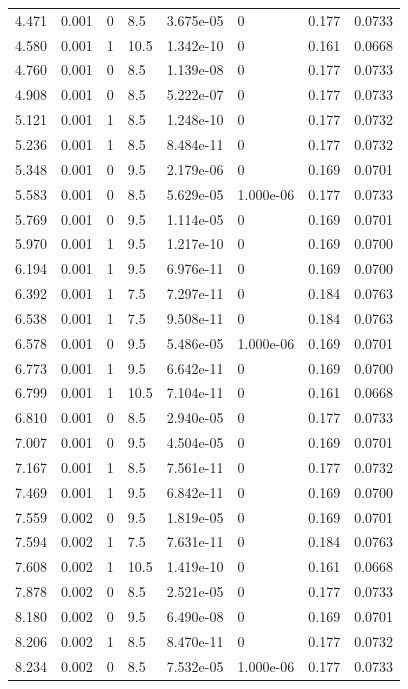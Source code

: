 \documentclass[preview]{standalone}
\begin{document}
{{\begin{tabular}{L{1.2cm}C{1.2cm} C{0.3cm}C{0.5cm} C{1.4cm}C{1.4cm} C{1.4cm}C{1.4cm}}
  4.471  &  0.001  & 0     & 8.5 &  3.675e-05  & 0  & 0.177 &  0.0733   \\ 
  4.580  &  0.001  & 1     & 10.5 &  1.342e-10  & 0  & 0.161 &  0.0668   \\ 
  4.760  &  0.001  & 0     & 8.5 &  1.139e-08  & 0  & 0.177 &  0.0733   \\ 
  4.908  &  0.001  & 0     & 8.5 &  5.222e-07  & 0  & 0.177 &  0.0733   \\ 
  5.121  &  0.001  & 1     & 8.5 &  1.248e-10  & 0  & 0.177 &  0.0732   \\ 
  5.236  &  0.001  & 1     & 8.5 &  8.484e-11  & 0  & 0.177 &  0.0732   \\ 
  5.348  &  0.001  & 0     & 9.5 &  2.179e-06  & 0  & 0.169 &  0.0701   \\ 
  5.583  &  0.001  & 0     & 8.5 &  5.629e-05  & 1.000e-06  & 0.177 &  0.0733   \\ 
  5.769  &  0.001  & 0     & 9.5 &  1.114e-05  & 0  & 0.169 &  0.0701   \\ 
  5.970  &  0.001  & 1     & 9.5 &  1.217e-10  & 0  & 0.169 &  0.0700   \\ 
  6.194  &  0.001  & 1     & 9.5 &  6.976e-11  & 0  & 0.169 &  0.0700   \\ 
  6.392  &  0.001  & 1     & 7.5 &  7.297e-11  & 0  & 0.184 &  0.0763   \\ 
  6.538  &  0.001  & 1     & 7.5 &  9.508e-11  & 0  & 0.184 &  0.0763   \\ 
  6.578  &  0.001  & 0     & 9.5 &  5.486e-05  & 1.000e-06  & 0.169 &  0.0701   \\ 
  6.773  &  0.001  & 1     & 9.5 &  6.642e-11  & 0  & 0.169 &  0.0700   \\ 
  6.799  &  0.001  & 1     & 10.5 &  7.104e-11  & 0  & 0.161 &  0.0668   \\ 
  6.810  &  0.001  & 0     & 8.5 &  2.940e-05  & 0  & 0.177 &  0.0733   \\ 
  7.007  &  0.001  & 0     & 9.5 &  4.504e-05  & 0  & 0.169 &  0.0701   \\ 
  7.167  &  0.001  & 1     & 8.5 &  7.561e-11  & 0  & 0.177 &  0.0732   \\ 
  7.469  &  0.001  & 1     & 9.5 &  6.842e-11  & 0  & 0.169 &  0.0700   \\ 
  7.559  &  0.002  & 0     & 9.5 &  1.819e-05  & 0  & 0.169 &  0.0701   \\ 
  7.594  &  0.002  & 1     & 7.5 &  7.631e-11  & 0  & 0.184 &  0.0763   \\ 
  7.608  &  0.002  & 1     & 10.5 &  1.419e-10  & 0  & 0.161 &  0.0668   \\ 
  7.878  &  0.002  & 0     & 8.5 &  2.521e-05  & 0  & 0.177 &  0.0733   \\ 
  8.180  &  0.002  & 0     & 9.5 &  6.490e-08  & 0  & 0.169 &  0.0701   \\ 
  8.206  &  0.002  & 1     & 8.5 &  8.470e-11  & 0  & 0.177 &  0.0732   \\ 
  8.234  &  0.002  & 0     & 8.5 &  7.532e-05  & 1.000e-06  & 0.177 &  0.0733   \\ 
\hline 
\end{tabular} 

}}
\end{document}
